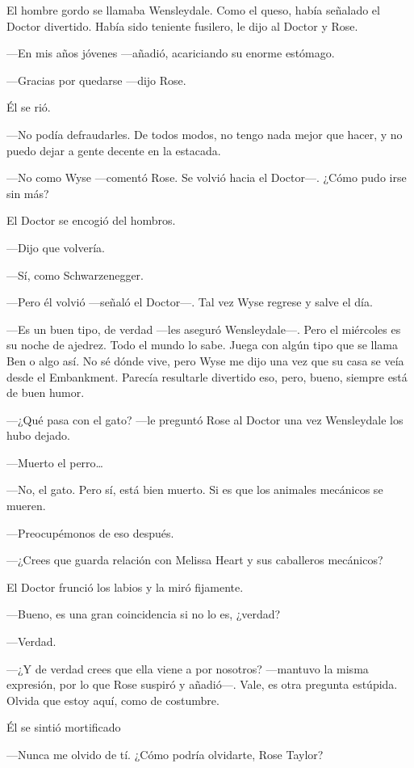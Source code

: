 \mbox{}

{El hombre gordo se llamaba Wensleydale. Como el queso, había señalado
	el Doctor divertido. Había sido teniente fusilero, le dijo al Doctor y
Rose.}

{---En mis años jóvenes ---añadió, acariciando su enorme estómago.}

{---Gracias por quedarse ---dijo Rose.}

{Él se rió.}

{---No podía defraudarles. De todos modos, no tengo nada mejor que
hacer, y no puedo dejar a gente decente en la estacada.}

{---No como Wyse ---comentó Rose. Se volvió hacia el Doctor---. ¿Cómo
pudo irse sin más?}

{El Doctor se encogió del hombros.}

{---Dijo que volvería.}

{---Sí, como Schwarzenegger.}

{---Pero él volvió ---señaló el Doctor---. Tal vez Wyse regrese y salve
el día.}

{---Es un buen tipo, de verdad ---les aseguró Wensleydale---. Pero el
	miércoles es su noche de ajedrez. Todo el mundo lo sabe. Juega con algún
	tipo que se llama Ben o algo así. No sé dónde vive, pero Wyse me dijo
	una vez que su casa se veía desde el Embankment. Parecía resultarle
divertido eso, pero, bueno, siempre está de buen humor.}

{---¿Qué pasa con el gato? ---le preguntó Rose al Doctor una vez
Wensleydale los hubo dejado.}

{---Muerto el perro\ldots{}}

{---No, el gato. Pero sí, está bien muerto. Si es que los animales
mecánicos se mueren.}

{---Preocupémonos de eso después.}

{---¿Crees que guarda relación con Melissa Heart y sus caballeros
mecánicos?}

{El Doctor frunció los labios y la miró fijamente.}

{---Bueno, es una gran coincidencia si no lo es, ¿verdad?}

{---Verdad.}

{---¿Y de verdad crees que ella viene a por nosotros? ---mantuvo la
	misma expresión, por lo que Rose suspiró y añadió---. Vale, es otra
pregunta estúpida. Olvida que estoy aquí, como de costumbre.}

{Él se sintió mortificado}

{---Nunca me olvido de tí. ¿Cómo podría olvidarte, Rose Taylor?}

